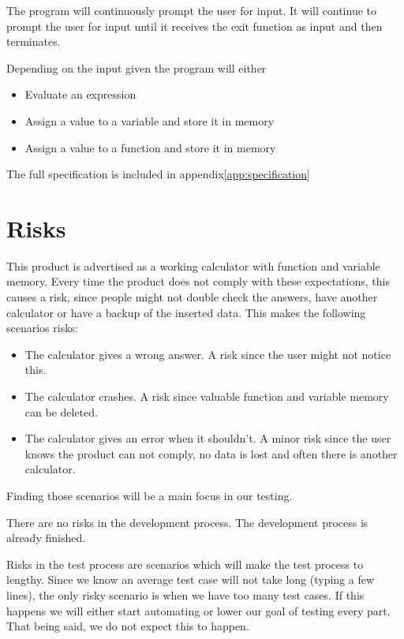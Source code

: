 \documentclass[11pt,a4paper]{article}
\begin{document}

The program will continuously prompt the user for input. It will
continue to prompt the user for input until it receives the exit
function as input and then terminates.

Depending on the input given the program will either

\begin{itemize}
\item Evaluate an expression
\item Assign a value to a variable and store it in memory
\item Assign a value to a function and store it in memory
\end{itemize}
The full specification is included in appendix\ref{app:specification}

\section{Risks}
This product is advertised as a working calculator with function and variable memory. Every time the product does not comply with these expectations, this causes a risk, since people might not double check the answers, have another calculator or have a backup of the inserted data. This makes the following scenarios risks:
\begin{itemize}
	\item The calculator gives a wrong answer. A risk since the user might not notice this.
	\item The calculator crashes. A risk since valuable function and variable memory can be deleted.
	\item The calculator gives an error when it shouldn't. A minor risk since the user knows the product can not comply, no data is lost and often there is another calculator.
\end{itemize}
Finding those scenarios will be a main focus in our testing.

There are no risks in the development process. The development process is already finished.

Risks in the test process are scenarios which will make the test process to lengthy. Since we know an average test case will not take long (typing a few lines), the only risky scenario is when we have too many test cases. If this happens we will either start automating or lower our goal of testing every part. That being said, we do not expect this to happen.
\end{document}
